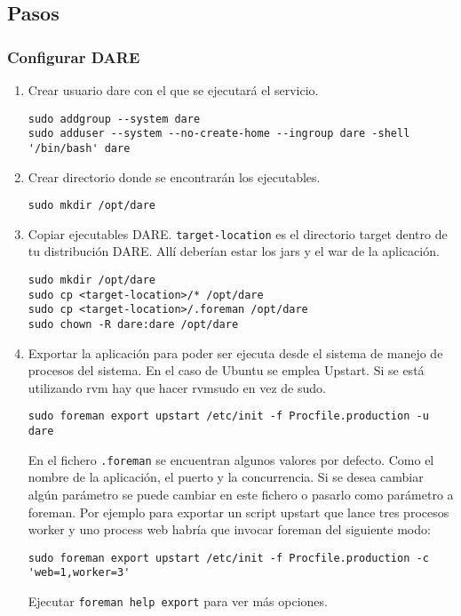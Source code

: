 \subsection{Pasos}

\subsubsection{Configurar DARE}
\begin{enumerate}
  \item Crear usuario dare con el que se ejecutará el servicio.
    \begin{verbatim}
sudo addgroup --system dare
sudo adduser --system --no-create-home --ingroup dare -shell '/bin/bash' dare
    \end{verbatim}
  \item Crear directorio donde se encontrarán los ejecutables.
    \begin{verbatim}
sudo mkdir /opt/dare
    \end{verbatim}
  \item Copiar ejecutables DARE. \verb+target-location+ es el
    directorio target dentro de tu distribución DARE. Allí deberían
    estar los jars y el war de la aplicación.
    \begin{verbatim}
sudo mkdir /opt/dare
sudo cp <target-location>/* /opt/dare
sudo cp <target-location>/.foreman /opt/dare
sudo chown -R dare:dare /opt/dare
    \end{verbatim}

  \item Exportar la aplicación para poder ser ejecuta desde el sistema
    de manejo de procesos del sistema. En el caso de Ubuntu se emplea
    Upstart\cite{UPSTART}. Si se está utilizando rvm hay que hacer
    rvmsudo en vez de sudo.

    \verb+sudo foreman export upstart /etc/init -f Procfile.production -u dare+

    En el fichero \verb+.foreman+ se encuentran algunos valores por
    defecto. Como el nombre de la aplicación, el puerto y la
    concurrencia. Si se desea cambiar algún parámetro se puede cambiar
    en este fichero o pasarlo como parámetro a foreman. Por ejemplo
    para exportar un script upstart que lance tres procesos worker y
    uno process web habría que invocar foreman del siguiente modo:

    \begin{verbatim}
sudo foreman export upstart /etc/init -f Procfile.production -c 'web=1,worker=3'
    \end{verbatim}
    Ejecutar \verb+foreman help export+ para ver más opciones.
\end{enumerate}

